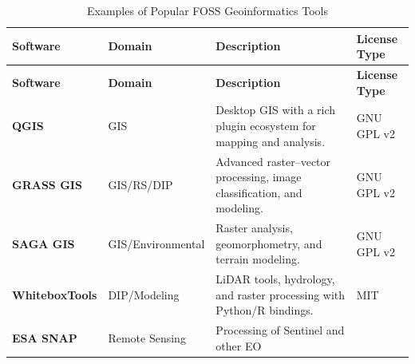 \documentclass[
  11pt,
  letterpaper,
]{book}
\begin{document}
\begin{longtable}[]{@{}
  >{\raggedright\arraybackslash}p{}
  >{\raggedright\arraybackslash}p{}
  >{\raggedright\arraybackslash}p{}
  >{\raggedright\arraybackslash}p{}@{}}
\caption{Examples of Popular FOSS Geoinformatics
Tools}\label{tbl-fossgeo}\tabularnewline
\toprule\noalign{}
\begin{minipage}[b]{\linewidth}\raggedright
\textbf{Software}
\end{minipage} & \begin{minipage}[b]{\linewidth}\raggedright
\textbf{Domain}
\end{minipage} & \begin{minipage}[b]{\linewidth}\raggedright
\textbf{Description}
\end{minipage} & \begin{minipage}[b]{\linewidth}\raggedright
\textbf{License Type}
\end{minipage} \\
\midrule\noalign{}
\endfirsthead
\toprule\noalign{}
\begin{minipage}[b]{\linewidth}\raggedright
\textbf{Software}
\end{minipage} & \begin{minipage}[b]{\linewidth}\raggedright
\textbf{Domain}
\end{minipage} & \begin{minipage}[b]{\linewidth}\raggedright
\textbf{Description}
\end{minipage} & \begin{minipage}[b]{\linewidth}\raggedright
\textbf{License Type}
\end{minipage} \\
\midrule\noalign{}
\endhead
\bottomrule\noalign{}
\endlastfoot
\textbf{QGIS} & GIS & Desktop GIS with a rich plugin ecosystem for
mapping and analysis. & GNU GPL v2 \\
\textbf{GRASS GIS} & GIS/RS/DIP & Advanced raster--vector processing,
image classification, and modeling. & GNU GPL v2 \\
\textbf{SAGA GIS} & GIS/Environmental & Raster analysis, geomorphometry,
and terrain modeling. & GNU GPL v2 \\
\textbf{WhiteboxTools} & DIP/Modeling & LiDAR tools, hydrology, and
raster processing with Python/R bindings. & MIT \\
\textbf{ESA SNAP} & Remote Sensing & Processing of Sentinel and other EO

\end{longtable}
\end{document}
